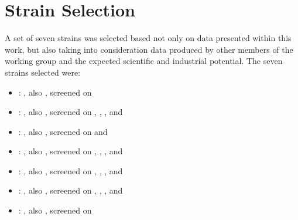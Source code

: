 \section{Strain Selection\label{sec-lch-eps-strain-selection}}
A set of seven strains was selected based not only on data presented within this work, but also taking into consideration data produced by other members of the working group and the expected scientific and industrial potential. The seven strains selected were:
\begin{itemize}
	\item {}: , also , screened on \acet{}
	\item {}: , also , screened on \fur{}, \hmf{}, \van{}, \acet{} and \fora{}
	\item {}: , also , screened on \van{} and \laev{}
	\item {}: , also , screened on \fur{}, \hmf{}, \van{}, \acet{} and \laev{}
	\item {}: , also , screened on \fur{}, \hmf{}, \acet{}, \fora{} and \laev{}
	\item {}: , also , screened on \fur{}, \hmf{}, \van{}, \acet{} and \laev{}
	\item {}: , also , screened on \van{}
\end{itemize}

%

